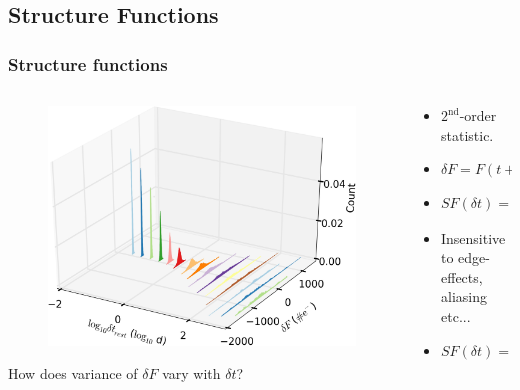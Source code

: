 \documentclass[hyperref={pdfpagelabels=false}]{beamer}
\begin{document}
\subsection{Structure Functions}

\begin{frame}
\frametitle{Structure functions}
  \begin{columns}
    \centering
    \begin{column}{0.6\textwidth}
      \begin{figure}
        \includegraphics[scale=0.0875]{images/kplr006932990-1stIncr_3D.jpg}
      \end{figure}
      \centering
      {\tiny How does variance of $\delta F$ vary with $\delta t$?}
    \end{column}
    \begin{column}{0.4\textwidth}
       \begin{itemize}
       \item $2^{\mathrm{nd}}$-order statistic.
       \item $\delta F = F(t+\delta t) - F(t)$
       \item $SF(\delta t) = \langle \vert \delta F \vert^{2} \rangle_{t}$
       \item Insensitive to edge-effects, aliasing etc...
       \item $SF(\delta t) = 2ACVF(0) - 2ACVF(\delta t)$
       \end{itemize}
    \end{column}
  \end{columns}
\end{frame}
\end{document}
